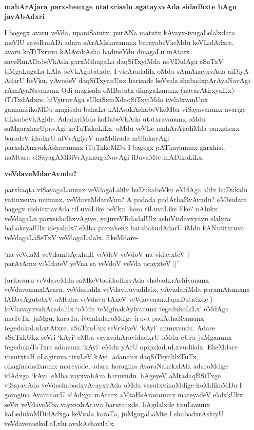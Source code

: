 \noindent
{\bf\large{mahArAjara parxshenxge utatxrisalu agatayxvAda sidadhxte hAgu javAbAdxri}}\label{page131}

I bagegx avaru veVda, upaniSatutx, purANa matutx kAvayx-ivugaLelalxdara meVlU saveRmADi adara sArAMshavanunx bareyabeVkeMdu keVLidAdxre. avaru koTiTxruva kAlAvakAsha hadineYdu dinagaLu mAtarx. saveRmADabeVkAda garxMthagaLa daqSiTxyiMda noVDidAga eSoTxV tiMgaLugaLa kAla beVkAgutatxde. I vicAradalilx oMdu sAmAnayxvAda aiDiyA AdarU beVku. yAvudeV daqSiTxyanUnx harisade keVvala shabadxpArAyaNavAgi rAmAyaNavanunx Odi mugisalu oMBatutx dinagaLanunx (navarAtirxyalilx) iTiTxdAdxre. hiVgiruvAga sUkaSxmXdaqSiTxyiMda ivelalxvanUnx gamanisikoMDu mugisalu bahaLa kAlAvakAshabeVkeMba viSayavanunx avarige tiLisabeVkAgide. AdadxriMda koDabeVkAda utatxravanunx oMdu saMgarxharUpavAgi koTuTxkoLiLx. oMdu veVLe mahArAjadiMda parxshenx baradeV idadxrU niVvAgiyeV maMdirada mUlakavAgi parxshAnxvakAshavanunx iTuTxkoMDu I bagegx pAThavanunx garxhisi, naMtara viSayagAMBiVrAyxnuguNavAgi iDuvaMte mADikoLiLx.

\noindent
{\bf\large{veVdaveMdarAvudu?}}\label{page132}

parxkaqta viSayagaLanunx veVdagaLalilx huDukabeVku eMdAga alilx huDukalu yatinxsuva munanx, veVdaveMdareVnu? A padada padAthaRvAvudu? eMbudara bagegx nishicxtavAda tiLuvaLike beVku. hosa tiLuvaLike Eke? nAlukx veVdagaLu parxsidadhxvAgive, yajuveVRdadalUlx ashiVtidavxyavu elalxra baLakeyalUlx ideyalalx? eMba parxshenx barabahudAdarU iMdu kANutitxruva veVdagaLaSeTxV veVdagaLalalx. EkeMdare-

\begin{shloka}
`na veVdaM veVdamitAyxhuH veVdeV veVdoV na vidayxteV |\\\label{132}
parAtAmx viMdateV yeVna sa veVdoV veVda ucayxteV ||'
\end{shloka}

(aritavaru veVdaveMdu saMkeVtasidadhxvAda shabadxrAshiyanunx veVdavenanxlAraru. veVdadalilx veVdaviruvudilalx. yAvudariMda paramAtamxna lABavAgutotxV aMtaha veVdavu tAneV veVdavenanxlapxDutatxde.) loVkavayxvahAradalilx `oMdu teMginakAyiyanunx tegedukoLiLx' eMdAga maTeTx, juMgu, karaTa, ivelalxdaroMdige iruva padAthaRvanunx tegedukoLuLxtAtxre. aSaTxnUnx seVrisiyeV `kAyi' anunxvudu. Adare aSaTxkUkx seVri `kAyi' eMba vayxvahAravidadxrU oMdu cUru juMganunx tegedukoTaTxre adanunx `kAyi' eMdu yArU opipxkoLuLxvudilalx. EkeMdare vasutxtaH oLagiruva tiruLeV kAyi. adanunx daqSiTxyalilxTuTx, oLaginadadxnunx mareyade, adara horagina AvaraNakekxlAlx adaroMdige idAdxga `kAyi' eMba vayxvahAra baruvudu. hAgeyeV aMtadaqRSiTxge viSayavAda veVdashabadxvAcayxvAda oMdu vasutxvinoMdige hoMdikoMDu I goragina AvaranavU idAdxga mAtarx aMtaHsAravanunx mareyadeV elalxkUkx seVri veVdaveMba vayxvahAravu barutatxde. hAgilalxde tiruLanunx kaLedukoMDidAdxga keVvala karaTa, juMgugaLaMte I shabadxrAshiyU veVdavenisikoLaLxlu avakAshavilalx.

